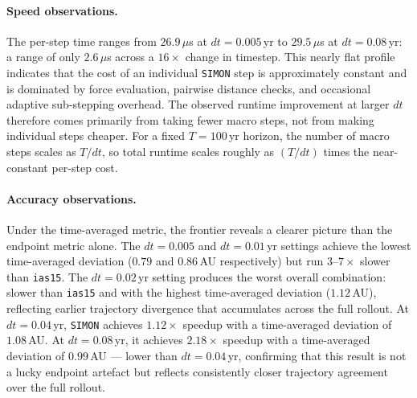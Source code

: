 \documentclass[12pt]{article}
\begin{document}
\paragraph{Speed observations.}
The per-step time ranges from $26.9\,\mu$s at $dt=0.005$\,yr to
$29.5\,\mu$s at $dt=0.08$\,yr: a range of only $2.6\,\mu$s across
a $16\times$ change in timestep. This nearly flat profile indicates
that the cost of an individual \texttt{SIMON} step is approximately
constant and is dominated by force evaluation, pairwise distance
checks, and occasional adaptive sub-stepping overhead. The observed
runtime improvement at larger $dt$ therefore comes primarily from
taking fewer macro steps, not from making individual steps cheaper.
For a fixed $T=100$\,yr horizon, the number of macro steps scales
as $T/dt$, so total runtime scales roughly as $(T/dt)$ times the
near-constant per-step cost.

\paragraph{Accuracy observations.}
Under the time-averaged metric, the frontier reveals a clearer picture
than the endpoint metric alone. The $dt=0.005$ and $dt=0.01$\,yr
settings achieve the lowest time-averaged deviation ($0.79$ and
$0.86$\,AU respectively) but run $3$--$7\times$ slower than
\texttt{ias15}. The $dt=0.02$\,yr setting produces the worst overall
combination: slower than \texttt{ias15} and with the highest
time-averaged deviation ($1.12$\,AU), reflecting earlier trajectory
divergence that accumulates across the full rollout. At $dt=0.04$\,yr,
\texttt{SIMON} achieves $1.12\times$ speedup with a time-averaged
deviation of $1.08$\,AU. At $dt=0.08$\,yr, it achieves $2.18\times$
speedup with a time-averaged deviation of $0.99$\,AU --- lower than
$dt=0.04$\,yr, confirming that this result is not a lucky endpoint
artefact but reflects consistently closer trajectory agreement over
the full rollout.
\end{document}
